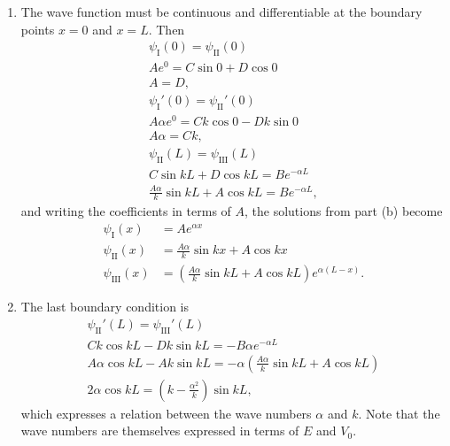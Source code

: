 \documentclass[a4paper,12pt]{article}
\begin{document}
\begin{enumerate}
\begin{enumerate}
            \item
                The wave function must be continuous and differentiable at the boundary points $x = 0$ and $x = L$. Then
                \begin{gather*}
                    \psi_\text{I}(0) = \psi_\text{II}(0) \\
                    Ae^0 = C\sin0 + D\cos0 \\
                    A = D, \\
                    \psi_\text{I}'(0) = \psi_\text{II}'(0) \\
                    A \alpha e^0 = C k \cos0 - D k \sin0 \\
                    A \alpha = C k, \\
                    \psi_\text{II}(L) = \psi_\text{III}(L) \\
                    C\sin{kL} + D\cos{kL} = Be^{-\alpha L} \\
                    \frac{A \alpha}{k} \sin{kL} + A \cos{kL} = Be^{-\alpha L},
                \end{gather*}
                and writing the coefficients in terms of $A$, the solutions from part (b) become
                \begin{align*}
                    \psi_\text{I}(x) &= Ae^{\alpha x} \\
                    \psi_\text{II}(x) &= \frac{A \alpha}{k} \sin{kx} + A\cos{kx} \\
                    \psi_\text{III}(x) &= \left( \frac{A \alpha}{k} \sin{kL} + A \cos{kL} \right) e^{\alpha (L - x)}.
                \end{align*}

            \item
                The last boundary condition is
                \begin{gather*}
                    \psi_\text{II}'(L) = \psi_\text{III}'(L) \\
                    Ck\cos{kL} - Dk\sin{kL} = -B\alpha e^{-\alpha L} \\
                    A\alpha \cos{kL} - Ak\sin{kL} = -\alpha \left( \frac{A\alpha}{k} \sin{kL} + A \cos{kL} \right) \\
                    2\alpha \cos{kL} = \left( k - \frac{\alpha^2}{k} \right) \sin{kL},
                \end{gather*}
                which expresses a relation between the wave numbers $\alpha$ and $k$. Note that the wave numbers are themselves expressed in terms of $E$ and $V_0$.
        \end{enumerate}


\end{enumerate}
\end{document}
